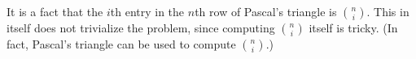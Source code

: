 \documentclass[10pt,openany,twoside,letterpaper,extrafontsizes]{memoir}
\newcommand{\mycaption}[1]{%
  \textsf{\textbf{\caption{\textnormal{\textsf{#1}}}} \stepcounter{figure_num}}%
}
\begin{document}
\begin{Spacing}{\arraysSpacing}
It is a fact that the $i$th entry in the $n$th row of Pascal's triangle
is $\binom{n}{i}$. This in itself does not trivialize the
problem, since computing $\binom{n}{i}$ itself is tricky.
(In fact, Pascal's triangle can be used to compute $\binom{n}{i}$.)


\ansend

%
%
%
%



\end{Spacing}
\end{document}
